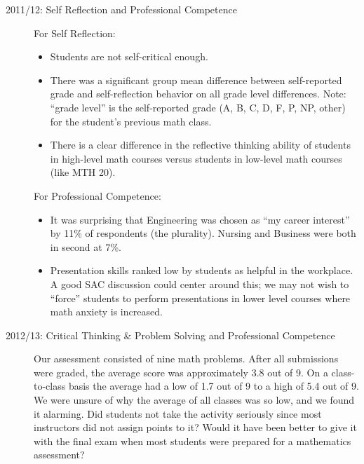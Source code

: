 \begin{description}

	\item[2011/12: Self Reflection and Professional Competence]
	      For Self Reflection:
	      \begin{itemize}
		      \item Students are not self-critical enough.
		      \item There was a significant group mean difference between self-reported grade and self-reflection behavior on all grade level differences.
		            Note: ``grade level'' is the self-reported grade (A, B, C, D, F, P, NP, other) for the student's previous math class.
		      \item There is a clear difference in the reflective thinking ability of students in high-level math courses versus students in low-level math courses (like MTH 20).
	      \end{itemize}
	      For Professional Competence:
	      \begin{itemize}
		      \item It was surprising that Engineering was chosen as ``my career interest'' by 11\% of respondents (the plurality).
		            Nursing and Business were both in second at 7\%.
		      \item Presentation skills ranked low by students as helpful in the workplace.
		            A good SAC discussion could center around this; we may not wish to ``force'' students to perform presentations in lower level courses where math anxiety is increased.
	      \end{itemize}

	\item[2012/13:  Critical Thinking \& Problem Solving and Professional Competence]

	      Our assessment consisted of nine math problems.
	      After all submissions were graded, the average score was approximately 3.8 out of 9.
	      On a class-to-class basis the average had a low of 1.7 out of 9 to a high of 5.4 out of 9.
	      We were unsure of why the average of all classes was so low, and we found it alarming.
	      Did students not take the activity seriously since most instructors did not assign points to it?
	      Would it have been better to give it with the final exam when most students were prepared for a mathematics assessment?


\end{description}
